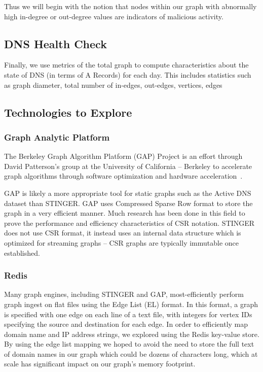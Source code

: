 \documentclass{acm_proc_article-sp}
\begin{document}
Thus we will begin with the notion that nodes within our graph with abnormally high in-degree or out-degree values are indicators of malicious activity.

\subsection{DNS Health Check}
Finally, we use metrics of the total graph to compute characteristics about the state of DNS (in terms of A Records) for each day. This includes statistics such as graph diameter, total number of in-edges, out-edges, vertices, edges

\subsection{Technologies to Explore}

\subsubsection{Graph Analytic Platform}
The Berkeley Graph Algorithm Platform (GAP) Project is an effort through David Patterson's group at the University of California -- Berkeley to accelerate graph algorithms through software optimization and hardware acceleration~\cite{GAP}. 

GAP is likely a more appropriate tool for static graphs such as the Active DNS dataset than STINGER. GAP uses Compressed Sparse Row format to store the graph in a very efficient manner. Much research has been done in this field to prove the performance and efficiency characteristics of CSR notation. STINGER does not use CSR format, it instead uses an internal data structure which is optimized for streaming graphs -- CSR graphs are typically immutable once established.

\subsubsection{Redis}
Many graph engines, including STINGER and GAP, most-efficiently perform graph ingest on flat files using the Edge List (EL) format. In this format, a graph is specified with one edge on each line of a text file, with integers for vertex IDs specifying the source and destination for each edge. In order to efficiently map domain name and IP address strings, we explored using the Redis key-value store. By using the edge list mapping we hoped to avoid the need to store the full text of domain names in our graph which could be dozens of characters long, which at scale has significant impact on our graph's memory footprint.
\end{document}
